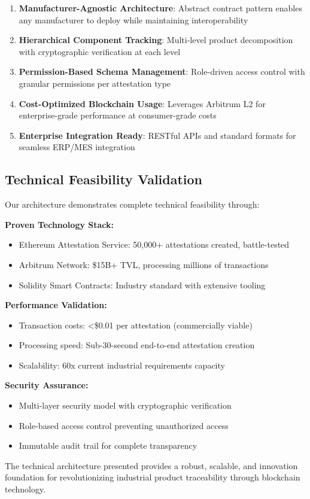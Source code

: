 \documentclass[11pt,a4paper]{article}
\begin{document}
\begin{enumerate}
    \item \textbf{Manufacturer-Agnostic Architecture}: Abstract contract pattern enables any manufacturer to deploy while maintaining interoperability
    \item \textbf{Hierarchical Component Tracking}: Multi-level product decomposition with cryptographic verification at each level
    \item \textbf{Permission-Based Schema Management}: Role-driven access control with granular permissions per attestation type
    \item \textbf{Cost-Optimized Blockchain Usage}: Leverages Arbitrum L2 for enterprise-grade performance at consumer-grade costs
    \item \textbf{Enterprise Integration Ready}: RESTful APIs and standard formats for seamless ERP/MES integration
\end{enumerate}

\subsection{Technical Feasibility Validation}

Our architecture demonstrates complete technical feasibility through:

\textbf{Proven Technology Stack:}
\begin{itemize}[leftmargin=0.5cm]
    \item Ethereum Attestation Service: 50,000+ attestations created, battle-tested
    \item Arbitrum Network: \$15B+ TVL, processing millions of transactions
    \item Solidity Smart Contracts: Industry standard with extensive tooling
\end{itemize}

\textbf{Performance Validation:}
\begin{itemize}[leftmargin=0.5cm]
    \item Transaction costs: <\$0.01 per attestation (commercially viable)
    \item Processing speed: Sub-30-second end-to-end attestation creation
    \item Scalability: 60x current industrial requirements capacity
\end{itemize}

\textbf{Security Assurance:}
\begin{itemize}[leftmargin=0.5cm]
    \item Multi-layer security model with cryptographic verification
    \item Role-based access control preventing unauthorized access
    \item Immutable audit trail for complete transparency
\end{itemize}

The technical architecture presented provides a robust, scalable, and innovation foundation for revolutionizing industrial product traceability through blockchain technology.
\end{document}
